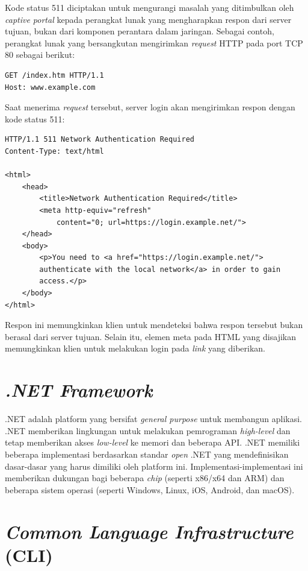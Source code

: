 Kode status 511 diciptakan untuk mengurangi masalah yang ditimbulkan oleh \textit{captive portal} kepada perangkat lunak yang mengharapkan respon dari server tujuan, bukan dari komponen perantara dalam jaringan. Sebagai contoh, perangkat lunak yang bersangkutan mengirimkan \textit{request} HTTP pada port TCP 80 sebagai berikut:

\begin{lstlisting}
GET /index.htm HTTP/1.1
Host: www.example.com
\end{lstlisting}

Saat menerima \textit{request} tersebut, server login akan mengirimkan respon dengan kode status 511:

\begin{lstlisting}
HTTP/1.1 511 Network Authentication Required
Content-Type: text/html

<html>
    <head>
        <title>Network Authentication Required</title>
        <meta http-equiv="refresh"
            content="0; url=https://login.example.net/">
    </head>
    <body>
        <p>You need to <a href="https://login.example.net/">
        authenticate with the local network</a> in order to gain
        access.</p>
    </body>
</html>
\end{lstlisting}

Respon ini memungkinkan klien untuk mendeteksi bahwa respon tersebut bukan berasal dari server tujuan. Selain itu, elemen meta pada HTML yang disajikan memungkinkan klien untuk melakukan login pada \textit{link} yang diberikan.



\section{\textit{.NET Framework}}
\label{sec:net_framework}

.NET adalah platform yang bersifat \textit{general purpose} untuk membangun aplikasi\cite{NET_PRIMER:2016}. .NET memberikan lingkungan untuk melakukan pemrograman \textit{high-level} dan tetap memberikan akses \textit{low-level} ke memori dan beberapa API. .NET memiliki beberapa implementasi berdasarkan standar \textit{open} .NET yang mendefinisikan dasar-dasar yang harus dimiliki oleh platform ini. Implementasi-implementasi ini memberikan dukungan bagi beberapa \textit{chip} (seperti x86/x64 dan ARM) dan beberapa sistem operasi (seperti Windows, Linux, iOS, Android, dan macOS).



\section{\textit{Common Language Infrastructure} (CLI)}
\label{sec:cli}

